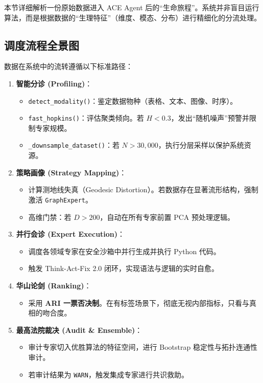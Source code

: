 \documentclass[12pt,a4paper]{article}
\begin{document}
本节详细解析一份原始数据进入 ACE Agent 后的“生命旅程”。系统并非盲目运行算法，而是根据数据的“生理特征”（维度、模态、分布）进行精细化的分流处理。

\subsection{调度流程全景图}

数据在系统中的流转遵循以下标准路径：

\begin{enumerate}[nosep]
    \item \textbf{智能分诊 (Profiling)}：
    \begin{itemize}
        \item \texttt{detect\_modality()}：鉴定数据物种（表格、文本、图像、时序）。
        \item \texttt{fast\_hopkins()}：评估聚类倾向。若 $H < 0.3$，发出“随机噪声”预警并限制专家规模。
        \item \texttt{\_downsample\_dataset()}：若 $N > 30,000$，执行分层采样以保护系统资源。
    \end{itemize}
    \item \textbf{策略画像 (Strategy Mapping)}：
    \begin{itemize}
        \item 计算测地线失真（Geodesic Distortion）。若数据存在显著流形结构，强制激活 \texttt{GraphExpert}。
        \item 高维门禁：若 $D > 200$，自动在所有专家前置 PCA 预处理逻辑。
    \end{itemize}
    \item \textbf{并行会诊 (Expert Execution)}：
    \begin{itemize}
        \item 调度各领域专家在安全沙箱中并行生成并执行 Python 代码。
        \item 触发 Think-Act-Fix 2.0 闭环，实现语法与逻辑的实时自愈。
    \end{itemize}
    \item \textbf{华山论剑 (Ranking)}：
    \begin{itemize}
        \item 采用 \textbf{ARI 一票否决制}。在有标签场景下，彻底无视内部指标，只看与真相的吻合度。
    \end{itemize}
    \item \textbf{最高法院裁决 (Audit \& Ensemble)}：
    \begin{itemize}
        \item 审计专家切入优胜算法的特征空间，进行 Bootstrap 稳定性与拓扑连通性审计。
        \item 若审计结果为 \texttt{WARN}，触发集成专家进行共识救助。
    \end{itemize}
\end{enumerate}
\end{document}
